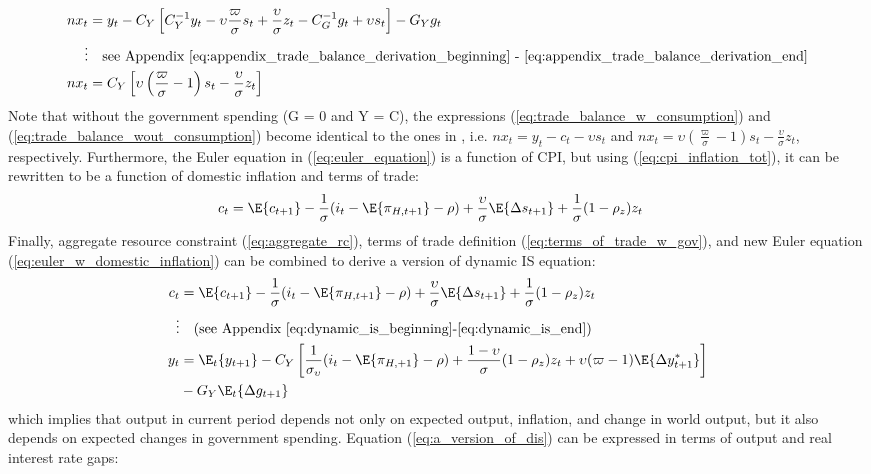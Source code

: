 \begin{align}
    nx_t&=y_t - C_Y\left[C_Y^{-1} y_t - \upsilon \frac{\varpi}{\sigma} s_t + \frac{\upsilon}{\sigma}z_t - C_G^{-1} g_t + \upsilon s_t \right] - G_Y g_t \\
    \vdots & \quad \text{see Appendix \ref{eq:appendix_trade_balance_derivation_beginning} - \ref{eq:appendix_trade_balance_derivation_end}} \nonumber \\
    nx_t&=C_Y\left[\upsilon \left(\frac{\varpi}{\sigma} - 1\right) s_t - \frac{\upsilon}{\sigma}z_t \right] \label{eq:trade_balance_wout_consumption}
\end{align}
Note that without the government spending (G = 0 and Y = C), the expressions (\ref{eq:trade_balance_w_consumption}) and (\ref{eq:trade_balance_wout_consumption}) become identical to the ones in \textcite{jordigal_2015_monetary}, i.e. $nx_t = y_t - c_t -\upsilon s_t$ and $nx_t = \upsilon \left(\frac{\varpi}{\sigma} - 1\right) s_t - \frac{\upsilon}{\sigma}z_t$, respectively. Furthermore, the Euler equation in (\ref{eq:euler_equation}) is a function of CPI, but using (\ref{eq:cpi_inflation_tot}), it can be rewritten to be a function of domestic inflation and terms of trade:
\begin{align}
    c_t &= \E\{ c_{t+1}\} - \frac{1}{\sigma}(i_t - \E \{ \pi_{H,t+1}\} - \rho) + \frac{\upsilon}{\sigma}\E \{ \Delta s_{t+1} \} + \frac{1}{\sigma}(1-\rho_z)z_t \label{eq:euler_w_domestic_inflation}
\end{align}
Finally, aggregate resource constraint (\ref{eq:aggregate_rc}), terms of trade definition (\ref{eq:terms_of_trade_w_gov}), and new Euler equation (\ref{eq:euler_w_domestic_inflation}) can be combined to derive a version of dynamic IS equation:
\begin{align}
    c_t &= \E\{ c_{t+1}\} - \frac{1}{\sigma}(i_t - \E \{ \pi_{H,t+1}\} - \rho) + \frac{\upsilon}{\sigma}\E \{ \Delta s_{t+1} \} + \frac{1}{\sigma}(1-\rho_z)z_t \\
    \vdots & \quad \text{(see Appendix \ref{eq:dynamic_is_beginning}-\ref{eq:dynamic_is_end})} \nonumber \\
    y_t  &= \E_t \{y_{t+1}\} - C_Y\left[\frac{1}{\sigma_\upsilon}(i_t - \E \{ \pi_{H,+1}\} - \rho) + \frac{1-\upsilon}{\sigma} (1-\rho_z)z_t + \upsilon (\varpi - 1)\E \{\Delta y_{t+1}^* \}\right] \nonumber \\ 
    & - G_Y \E_t \{\Delta g_{t+1}\} \label{eq:a_version_of_dis}
\end{align}
which implies that output in current period depends not only on expected output, inflation, and change in world output, but it also depends on expected changes in government spending. Equation (\ref{eq:a_version_of_dis}) can be expressed in terms of output and real interest rate gaps:
